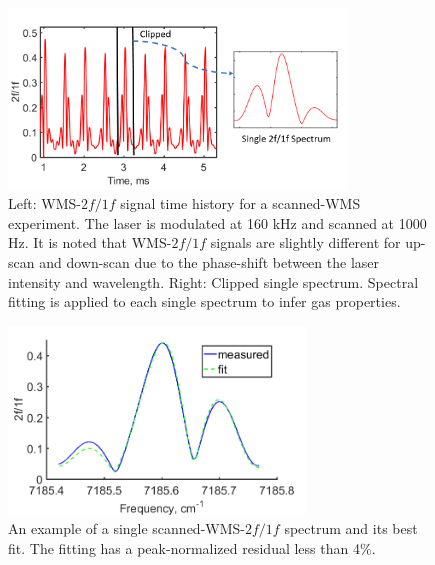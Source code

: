  \begin{figure}[h]
    \centering
        \includegraphics[trim = 0mm 0mm 0mm 0mm, clip=true, width=0.8\textwidth]{fig/ch3_fig6.png}
        \caption{Left: WMS-$2f/1f$ signal time history for a scanned-WMS experiment. The laser is modulated at 160 kHz and scanned at 1000 Hz. It is noted that WMS-$2f/1f$ signals are slightly different for up-scan and down-scan due to the phase-shift between the laser intensity and wavelength. Right: Clipped single spectrum. Spectral fitting is applied to each single spectrum to infer gas properties.}
    \label{fig:ch3_5}
\end{figure}

 \begin{figure}[h]
    \centering
        \includegraphics[width=0.7\textwidth]{fig/ch3_fig7.png}
        \caption{An example of a single scanned-WMS-$2f/1f$ spectrum and its best fit. The fitting has a peak-normalized residual less than 4$\%$.}
    \label{fig:ch3_6}
\end{figure}

\vspace{30mm}


